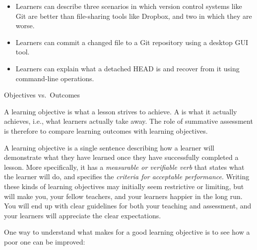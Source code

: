 \begin{itemize}

\item
  Learners can describe three scenarios in which version control systems
  like Git are better than file-sharing tools like Dropbox, and two in
  which they are worse.

\item
  Learners can commit a changed file to a Git repository using a desktop
  GUI tool.

\item
  Learners can explain what a detached HEAD is and recover from it using
  command-line operations.

\end{itemize}

\begin{callout}{Objectives vs.\ Outcomes}

  A learning objective is what a lesson strives to achieve. A
   is what it actually
  achieves, i.e., what learners actually take away. The role of
  summative assessment is therefore to compare learning outcomes with
  learning objectives.

\end{callout}

A learning objective is a single sentence describing how a learner
will demonstrate what they have learned once they have successfully
completed a lesson.  More specifically, it has a \emph{measurable or
  verifiable verb} that states what the learner will do, and specifies
the \emph{criteria for acceptable performance}. Writing these kinds of
learning objectives may initially seem restrictive or limiting, but
will make you, your fellow teachers, and your learners happier in the
long run. You will end up with clear guidelines for both your teaching
and assessment, and your learners will appreciate the clear
expectations.

One way to understand what makes for a good learning objective is to
see how a poor one can be improved:

